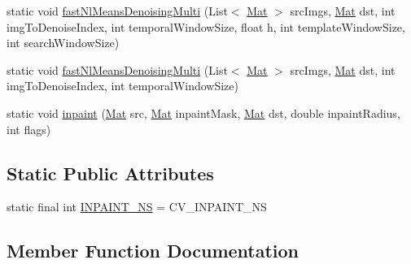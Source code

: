 \begin{DoxyCompactItemize}
\item 
static void \mbox{\hyperlink{classorg_1_1opencv_1_1photo_1_1_photo_a1c97ec2518473abe56b2b7c3f4677ce0}{fast\+Nl\+Means\+Denoising\+Multi}} (List$<$ \mbox{\hyperlink{classorg_1_1opencv_1_1core_1_1_mat}{Mat}} $>$ src\+Imgs, \mbox{\hyperlink{classorg_1_1opencv_1_1core_1_1_mat}{Mat}} dst, int img\+To\+Denoise\+Index, int temporal\+Window\+Size, float h, int template\+Window\+Size, int search\+Window\+Size)
\item 
static void \mbox{\hyperlink{classorg_1_1opencv_1_1photo_1_1_photo_a57edbe0ed64fa5bea7b543e3efbb4fb4}{fast\+Nl\+Means\+Denoising\+Multi}} (List$<$ \mbox{\hyperlink{classorg_1_1opencv_1_1core_1_1_mat}{Mat}} $>$ src\+Imgs, \mbox{\hyperlink{classorg_1_1opencv_1_1core_1_1_mat}{Mat}} dst, int img\+To\+Denoise\+Index, int temporal\+Window\+Size)
\item 
static void \mbox{\hyperlink{classorg_1_1opencv_1_1photo_1_1_photo_a0636bf0f1c7381aaddd4fb3bbf2aec16}{inpaint}} (\mbox{\hyperlink{classorg_1_1opencv_1_1core_1_1_mat}{Mat}} src, \mbox{\hyperlink{classorg_1_1opencv_1_1core_1_1_mat}{Mat}} inpaint\+Mask, \mbox{\hyperlink{classorg_1_1opencv_1_1core_1_1_mat}{Mat}} dst, double inpaint\+Radius, int flags)
\end{DoxyCompactItemize}
\subsection*{Static Public Attributes}
\begin{DoxyCompactItemize}
\item 
static final int \mbox{\hyperlink{classorg_1_1opencv_1_1photo_1_1_photo_ab5ecc2801d3e796424c564f7e09665c1}{I\+N\+P\+A\+I\+N\+T\+\_\+\+NS}} = C\+V\+\_\+\+I\+N\+P\+A\+I\+N\+T\+\_\+\+NS
\end{DoxyCompactItemize}


\subsection{Member Function Documentation}
\mbox{\label{classorg_1_1opencv_1_1photo_1_1_photo_acbb2502090325d4b0e7f6cf6c5f171a0}} 
